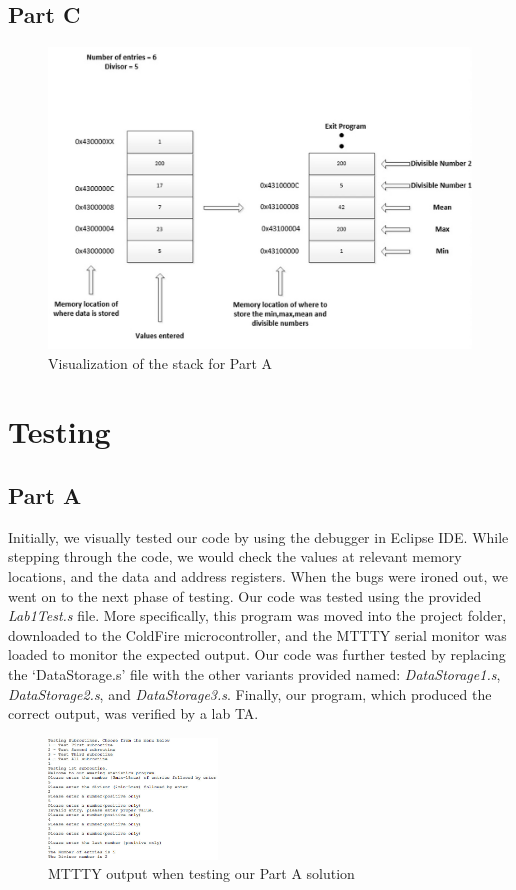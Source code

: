 \documentclass[letterpaper]{article}
\begin{document}
    \subsection{Part C}
    \begin{figure}[h!]
      \centering
      \includegraphics[width=.8\textwidth]{designc.jpg}
      \caption{Visualization of the stack for Part A}
    \end{figure}
\section{Testing}
  \subsection{Part A}
    Initially, we visually tested our code by using the debugger in Eclipse IDE.
    While stepping through the code, we would check the values at relevant memory
    locations, and the data and address registers. When the bugs were ironed out,
    we went on to the next phase of testing.
    Our code was tested using the provided \textit{Lab1Test.s} file. More specifically,
    this program was moved into the project folder, downloaded to the ColdFire microcontroller,
    and the MTTTY serial monitor was loaded to monitor the expected output. Our code was
    further tested by replacing the `DataStorage.s' file with the other variants provided
    named: \textit{DataStorage1.s}, \textit{DataStorage2.s}, and \textit{DataStorage3.s}.
    Finally, our program, which produced the correct output, was verified by a lab TA.

    \begin{figure}[H]
      \centering
      \includegraphics[width=0.4\textwidth]{parta.jpg}
      \caption{MTTTY output when testing our Part A solution}
    \end{figure}
\end{document}
